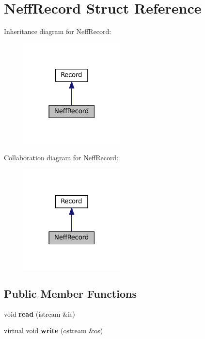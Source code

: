 \hypertarget{structNeffRecord}{}\section{Neff\+Record Struct Reference}
\label{structNeffRecord}


Inheritance diagram for Neff\+Record\+:
\nopagebreak
\begin{figure}[H]
\begin{center}
\leavevmode
\includegraphics[width=150pt]{structNeffRecord__inherit__graph}
\end{center}
\end{figure}


Collaboration diagram for Neff\+Record\+:
\nopagebreak
\begin{figure}[H]
\begin{center}
\leavevmode
\includegraphics[width=150pt]{structNeffRecord__coll__graph}
\end{center}
\end{figure}
\subsection*{Public Member Functions}
\begin{DoxyCompactItemize}
\item 
\mbox{\label{structNeffRecord_a41d40040ebb0f4104f87f73430e9c525}} 
void {\bfseries read} (istream \&is)
\item 
\mbox{\label{structNeffRecord_a46ffe8c91bcce59f91bf03fd4cd52586}} 
virtual void {\bfseries write} (ostream \&os)
\end{DoxyCompactItemize}
